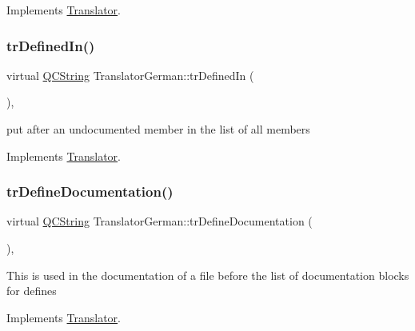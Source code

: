 Implements \mbox{\hyperlink{class_translator}{Translator}}.

\mbox{\label{class_translator_german_ab5b6c9d40b2a85da4f171035230bebc4}} 
\subsubsection{\texorpdfstring{trDefinedIn()}{trDefinedIn()}}
{\footnotesize\ttfamily virtual \mbox{\hyperlink{class_q_c_string}{Q\+C\+String}} Translator\+German\+::tr\+Defined\+In (\begin{DoxyParamCaption}{ }\end{DoxyParamCaption})\hspace{0.3cm}{\ttfamily [inline]}, {\ttfamily [virtual]}}

put after an undocumented member in the list of all members 

Implements \mbox{\hyperlink{class_translator}{Translator}}.

\mbox{\label{class_translator_german_a5d01fbef4c02d5aa267e467a9bc40c04}} 
\subsubsection{\texorpdfstring{trDefineDocumentation()}{trDefineDocumentation()}}
{\footnotesize\ttfamily virtual \mbox{\hyperlink{class_q_c_string}{Q\+C\+String}} Translator\+German\+::tr\+Define\+Documentation (\begin{DoxyParamCaption}{ }\end{DoxyParamCaption})\hspace{0.3cm}{\ttfamily [inline]}, {\ttfamily [virtual]}}

This is used in the documentation of a file before the list of documentation blocks for defines 

Implements \mbox{\hyperlink{class_translator}{Translator}}.

\mbox{\label{class_translator_german_ae030a1167bd0937e71b066274da2ca12}} 
